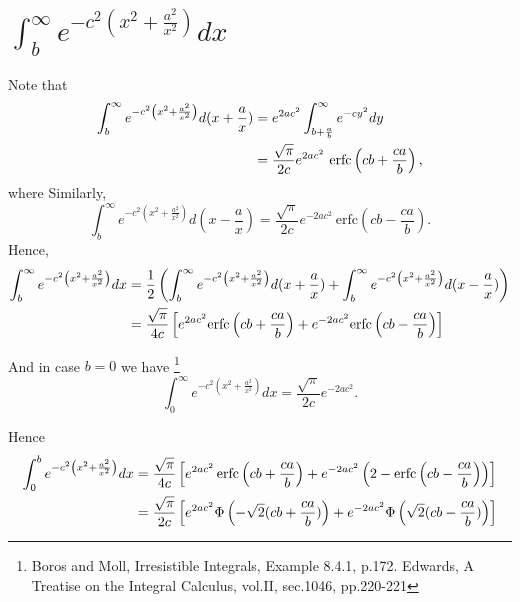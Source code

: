 \section{$\int_b^{\infty} e^{-c^2 ( x^2+\frac{a^2}{x^2} ) } dx $ }
Note that
\begin{align*}
  \int_b^{\infty} e^{-c^2 \left( x^2+\frac{a^2}{x^2} \right) } d(x+\frac{a}{x})
    &= e^{2ac^2} \int_{b+\frac{a}{b}}^{\infty} e^{-c y^2} dy  \notag  \\
    &= \frac{ \sqrt{\pi} }{2c} e^{2a c^2} 
       \ \mathrm{erfc} \left( c b + \frac{c a}{b} \right),
\end{align*}
where
Similarly,
\[
  \int_b^{\infty} e^{-c^2 \left( x^2+\frac{a^2}{x^2} \right) } d(x-\frac{a}{x})
    = \frac{ \sqrt{\pi} }{2c} e^{-2a c^2} 
      \ \mathrm{erfc} \left( c b - \frac{c a}{b} \right).
\]
Hence,
\begin{align}
  \int_b^{\infty} e^{-c^2 \left( x^2+\frac{a^2}{x^2} \right) } dx
    &= \frac{1}{2} \left(  
         \int_b^{\infty} e^{-c^2 \left( x^2+\frac{a^2}{x^2} \right) } d(x+\frac{a}{x})
         + \int_b^{\infty} e^{-c^2 \left( x^2+\frac{a^2}{x^2} \right) } d(x-\frac{a}{x})
       \right)  \notag  \\
    &= \frac{\sqrt{\pi}}{4c} 
       \left[ 
         e^{2a c^2} \mathrm{erfc} \left( c b + \frac{c a}{b} \right)
         + e^{-2a c^2} \mathrm{erfc} \left( c b - \frac{c a}{b} \right)
       \right]  \label{E:int1}
\end{align}

And in case $b=0$ we have
\footnote{Boros and Moll, Irresistible Integrals, Example 8.4.1, p.172.
  Edwards, A Treatise on the Integral Calculus, vol.II, sec.1046, pp.220-221}
\begin{equation}
  \int_0^{\infty} e^{-c^2 \left( x^2+\frac{a^2}{x^2} \right) } dx
    = \frac{\sqrt{\pi}}{2c} e^{-2a c^2}.
\end{equation}

Hence
\begin{align}
  \int_0^b e^{ -c^2 \left( x^2+\frac{a^2}{x^2} \right) } dx
    &= \frac{\sqrt{\pi}}{4c} 
       \left[ 
         e^{2a c^2} \operatorname*{erfc} \left( c b + \frac{c a}{b} \right)
         + e^{-2a c^2} \left( 2 - \operatorname*{erfc} \left( c b - \frac{c a}{b} \right) \right)
       \right] \notag \\
    &= \frac{\sqrt{\pi}}{2c} 
       \left[ 
         e^{2a c^2} \Phi \left( -\sqrt{2} (c b + \frac{c a}{b}) \right)
         + e^{-2a c^2} \Phi \left( \sqrt{2} (c b - \frac{c a}{b}) \right)
       \right] 
\end{align}


